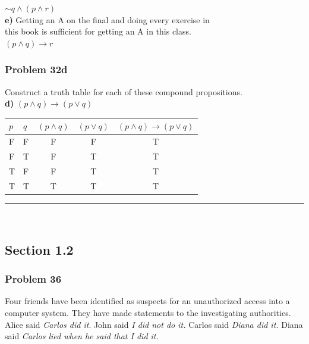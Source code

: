 \documentclass[paper=a4, fontsize=11pt]{scrartcl} %
\newcommand*{\oldneg}{\mathord{\sim}}
\newcommand{\horrule}[1]{\rule{\linewidth}{#1}} %
\begin{document}
$\oldneg q \land (p \land r)$\\

\textbf{e)} Getting an A on the final and doing every exercise in\\
this book is sufficient for getting an A in this class.\\

$(p \land q) \to r$\\

\subsubsection*{Problem 32d}
Construct a truth table for each of these compound propositions.\\
\textbf{d)} $(p \land q) \to (p \lor q)$\\

\begin{table}[H]
    \centering
    \begin{tabular}{ll|cc|c}
	$p$ & $q$ & \multicolumn{1}{l}{$(p \land q)$} & \multicolumn{1}{l|}{$(p \lor q)$} & \multicolumn{1}{l}{$(p \land q) \to (p \lor q)$} \\ \hline
	F & F & F & F & T \\
	F & T & F & T & T \\
	T & F & F & T & T \\
	T & T & T & T & T
    \end{tabular}
\end{table}


\horrule{0.5pt} \\ %
\subsection*{Section 1.2}
\subsubsection*{Problem 36}

Four friends have been identified as suspects for an unauthorized access into a computer 
system. They have made statements to the investigating authorities. Alice said
\textit{Carlos did it}. John said \textit{I did not do it.} Carlos said
\textit{Diana did it.} Diana said \textit{Carlos lied when he said that
I did it.}\\
\end{document}
